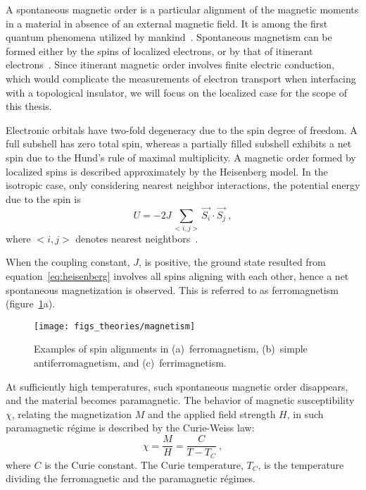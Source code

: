 A spontaneous magnetic order is a particular alignment of the magnetic moments in a material in absence of an external magnetic field. It is among the first quantum phenomena utilized by mankind~\cite{mag_history}. Spontaneous magnetism can be formed either by the spins of localized electrons, or by that of itinerant electrons~\cite{moriya1984}. Since itinerant magnetic order involves finite electric conduction, which would complicate the measurements of electron transport when interfacing with a topological insulator, we will focus on the localized case for the scope of this thesis.

Electronic orbitals have two-fold degeneracy due to the spin degree of freedom. A full subshell has zero total spin, whereas a partially filled subshell exhibits a net spin due to the Hund's rule of maximal multiplicity. A magnetic order formed by localized spins is described approximately by the Heisenberg model. In the isotropic case, only considering nearest neighbor interactions, the potential energy due to the spin is%
\begin{equation}%
    U = -2J \sum_{<i, j>} \vec{S_i} \cdot \vec{S_j}~,\label{eq:heisenberg}%
\end{equation}%
where $<i, j>$ denotes nearest neightbors~\cite{kittel}.

When the coupling constant, $J$, is positive, the ground state resulted from equation~\ref{eq:heisenberg} involves all spins aligning with each other, hence a net spontaneous magnetization is observed. This is referred to as ferromagnetism (figure~\ref{fig:bg_mag}a). %
\begin{figure}[ht]%
    \centering%
    \texttt{[image: figs\_theories/magnetism]}%
    \caption[Spin alignments in ferromagnetism, antiferromagnetism, and ferrimagnetism]{\label{fig:bg_mag}Examples of spin alignments in (a)~ferromagnetism, (b)~simple antiferromagnetism, and (c)~ferrimagnetism.}%
\end{figure}%
%
At sufficiently high temperatures, such spontaneous magnetic order disappears, and the material becomes paramagnetic. The behavior of magnetic susceptibility $\chi$, relating the magnetization $M$ and the applied field strength $H$, in such paramagnetic r\'egime is described by the Curie-Weiss law:%
\begin{equation}%
    \chi = \frac{M}{H} = \frac{C}{T - T_C}~,\label{eq:curie_weiss}%
\end{equation}%
where $C$ is the Curie constant. The Curie temperature, $T_C$, is the temperature dividing the ferromagnetic and the paramagnetic r\'egimes.

